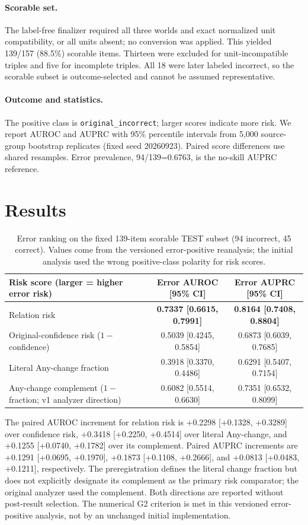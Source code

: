 \documentclass[11pt]{article}
\begin{document}
\paragraph{Scorable set.} The label-free finalizer required all three worlds and exact normalized unit compatibility, or all units absent; no conversion was applied. This yielded 139/157 (88.5\%) scorable items. Thirteen were excluded for unit-incompatible triples and five for incomplete triples. All 18 were later labeled incorrect, so the scorable subset is outcome-selected and cannot be assumed representative.
\paragraph{Outcome and statistics.} The positive class is \texttt{original\_incorrect}; larger scores indicate more risk. We report AUROC and AUPRC with 95\% percentile intervals from 5,000 source-group bootstrap replicates (fixed seed 20260923). Paired score differences use shared resamples. Error prevalence, 94/139=0.6763, is the no-skill AUPRC reference.

\section{Results}
\begin{table}[t]
\centering\small
\begin{tabular}{@{}lcc@{}}
\toprule
Risk score (larger = higher error risk) & Error AUROC [95\% CI] & Error AUPRC [95\% CI] \\
\midrule
Relation risk & \textbf{0.7337 [0.6615, 0.7991]} & \textbf{0.8164 [0.7408, 0.8804]} \\
Original-confidence risk ($1-$confidence) & 0.5039 [0.4245, 0.5854] & 0.6873 [0.6039, 0.7685] \\
Literal Any-change fraction & 0.3918 [0.3370, 0.4486] & 0.6291 [0.5407, 0.7154] \\
Any-change complement ($1-$fraction; v1 analyzer direction) & 0.6082 [0.5514, 0.6630] & 0.7351 [0.6532, 0.8099] \\
\bottomrule
\end{tabular}
\caption{Error ranking on the fixed 139-item scorable TEST subset (94 incorrect, 45 correct). Values come from the versioned error-positive reanalysis; the initial analysis used the wrong positive-class polarity for risk scores.}
\label{tab:primary}
\end{table}

The paired AUROC increment for relation risk is +0.2298 [+0.1328, +0.3289] over confidence risk, +0.3418 [+0.2250, +0.4514] over literal Any-change, and +0.1255 [+0.0740, +0.1782] over its complement. Paired AUPRC increments are +0.1291 [+0.0695, +0.1970], +0.1873 [+0.1108, +0.2666], and +0.0813 [+0.0483, +0.1211], respectively. The preregistration defines the literal change fraction but does not explicitly designate its complement as the primary risk comparator; the original analyzer used the complement. Both directions are reported without post-result selection. The numerical G2 criterion is met in this versioned error-positive analysis, not by an unchanged initial implementation.
\end{document}
